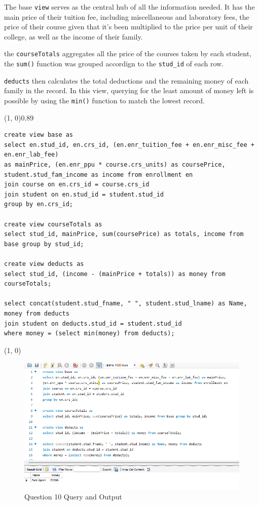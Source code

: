 
The base \texttt{view} serves as the central hub of all the information needed. It has the main price of their tuition fee, including miscellaneous and laboratory fees, the price of their course given that it's been multiplied to the price per unit of their college, as well as the income of their family.

the \texttt{courseTotals} aggregates all the price of the courses taken by each student, the \texttt{sum()} function was grouped accordign to the \texttt{stud\_id} of each row. 

\texttt{deducts} then calculates the total deductions and the remaining money of each family in the record. In this view, querying for the least amount of money left is possible by using the \texttt{min()} function to match the lowest record.
\vspace{\baselineskip}

\sol{}
\noindent\line(1, 0){0.89\linewidth}
\begin{verbatim}
create view base as
select en.stud_id, en.crs_id, (en.enr_tuition_fee + en.enr_misc_fee + en.enr_lab_fee)
as mainPrice, (en.enr_ppu * course.crs_units) as coursePrice, student.stud_fam_income as income from enrollment en
join course on en.crs_id = course.crs_id
join student on en.stud_id = student.stud_id
group by en.crs_id;

create view courseTotals as
select stud_id, mainPrice, sum(coursePrice) as totals, income from base group by stud_id;

create view deducts as
select stud_id, (income - (mainPrice + totals)) as money from courseTotals;

select concat(student.stud_fname, " ", student.stud_lname) as Name, money from deducts 
join student on deducts.stud_id = student.stud_id
where money = (select min(money) from deducts);
\end{verbatim}
\noindent\line(1, 0){\linewidth}

\begin{figure}[H]
    \centering
    \includegraphics[width=0.7\linewidth]{images/q10.png}
    \caption{Question 10 Query and Output}
\end{figure}
